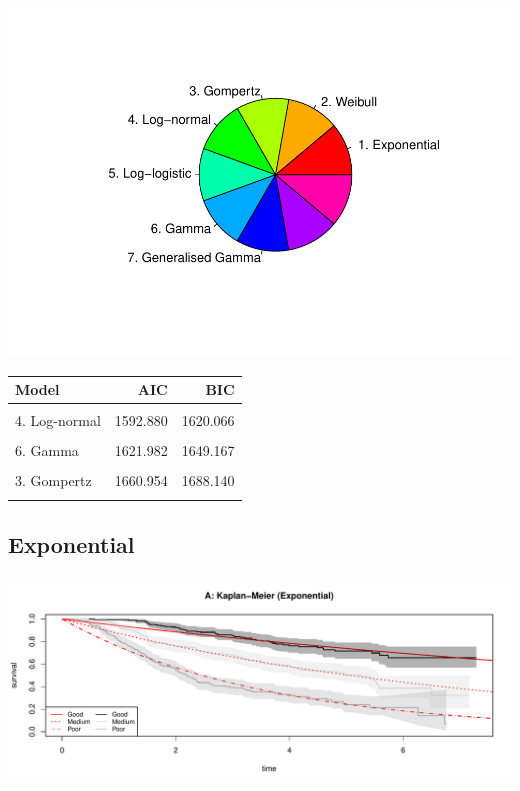 \documentclass[]{article}
\begin{document}
\begin{flushleft}\includegraphics{Images/plot_parametric-1} \end{flushleft}

\begin{table}[H]
\centering
\begin{tabular}{lrr}
\toprule
Model & AIC & BIC\\
\midrule
\cellcolor{gray!6}{7. Generalised Gamma} & \cellcolor{gray!6}{1589.049} & \cellcolor{gray!6}{1629.826}\\
4. Log-normal & 1592.880 & 1620.066\\
\cellcolor{gray!6}{5. Log-logistic} & \cellcolor{gray!6}{1609.294} & \cellcolor{gray!6}{1636.479}\\
6. Gamma & 1621.982 & 1649.167\\
\cellcolor{gray!6}{2. Weibull} & \cellcolor{gray!6}{1632.618} & \cellcolor{gray!6}{1659.803}\\
3. Gompertz & 1660.954 & 1688.140\\
\cellcolor{gray!6}{1. Exponential} & \cellcolor{gray!6}{1668.212} & \cellcolor{gray!6}{1681.805}\\
\bottomrule
\end{tabular}
\end{table}

\newpage

\subsection{Exponential}\label{exponential}

\begin{flushleft}\includegraphics[height=0.25\textheight]{Images/expo-1} \end{flushleft}
\end{document}
